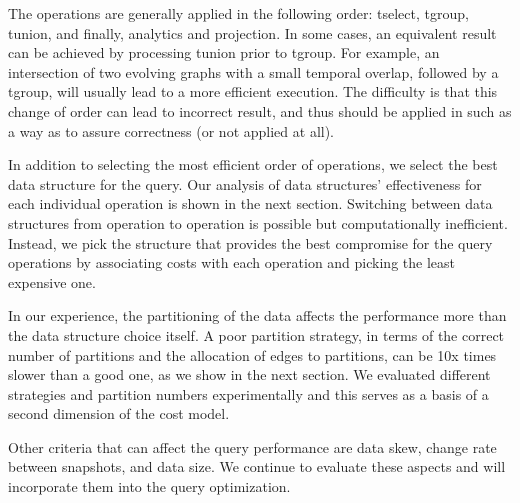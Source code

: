 The operations are generally applied in the following order: tselect,
tgroup, tunion, and finally, analytics and projection.  In some cases,
an equivalent result can be achieved by processing tunion prior to
tgroup.  For example, an intersection of two evolving graphs with a
small temporal overlap, followed by a tgroup, will usually lead to a
more efficient execution.    The difficulty is that this change of order can lead
to incorrect result, and thus should be applied in such as a way as to
assure correctness (or not applied at all).

In addition to selecting the most efficient order of operations, we
select the best data structure for the query.  Our analysis of data
structures' effectiveness for each individual operation is shown in
the next section.  Switching between data structures from operation to
operation is possible but computationally inefficient.  Instead, we
pick the structure that provides the best compromise for the query
operations by associating costs with each operation and picking the
least expensive one.  

In our experience, the partitioning of the data affects the
performance more than the data structure choice itself.  A poor
partition strategy, in terms of the correct number of partitions and
the allocation of edges to partitions, can be 10x times slower than a
good one, as we show in the next section.  We evaluated different
strategies and partition numbers experimentally and this serves as a
basis of a second dimension of the cost model.

Other criteria that can affect the query performance are data skew,
change rate between snapshots, and data size.  We continue to evaluate
these aspects and will incorporate them into the query optimization.
